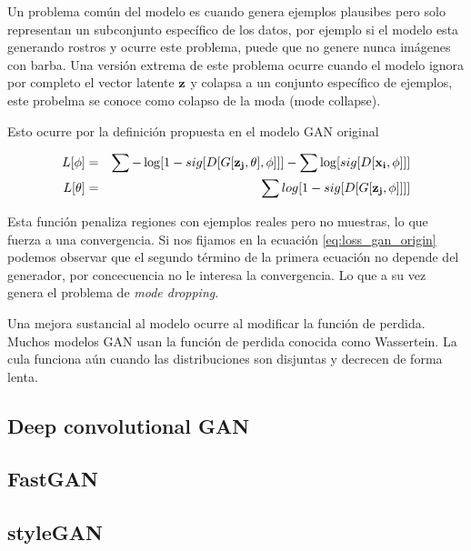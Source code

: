 \documentclass[letterpaper,12pt,oneside]{book}
\begin{document}
                    Un problema común del modelo es cuando genera ejemplos plausibes pero solo representan un subconjunto específico de los datos, por ejemplo si el modelo esta generando rostros y ocurre este problema, puede que no genere nunca imágenes con barba. Una versión extrema de este problema ocurre cuando el modelo ignora por completo el vector latente ${\bf z}$ y colapsa a un conjunto específico de ejemplos, este probelma se conoce como colapso de la moda (mode collapse).

                    Esto ocurre por la definición propuesta en el modelo GAN original 
                    
                    \begin{eqnarray}
                        \label{eq:loss_gan_origin}
                        L[\phi] &=& \sum -\log[1 - sig[D[G[{\bf z_j, \theta}],\phi]]] - \sum \log[sig[D[{\bf x_i}, \phi]]]\\
                        L[\theta] &=& \sum log[1 - sig[D[G[{\bf z_j}, \phi]]]]
                    \end{eqnarray}

                    Esta función penaliza regiones con ejemplos reales pero no muestras, lo que fuerza a una convergencia. Si nos fijamos en la ecuación \ref{eq:loss_gan_origin} podemos observar que el segundo término de la primera ecuación no depende del generador, por concecuencia no le interesa la convergencia. Lo que a su vez genera el problema de {\it mode dropping}.

                    Una mejora sustancial al modelo ocurre al modificar la función de perdida. Muchos modelos GAN usan la función de perdida conocida como Wassertein. La cula funciona aún cuando las distribuciones son disjuntas y decrecen de forma lenta. 

                    

                \subsection{Deep convolutional GAN}

                    
                \subsection{FastGAN}

                \subsection{styleGAN}

            
            


        \printbibliography
        \nocite{*}
        \backmatter%

    
\end{document}

